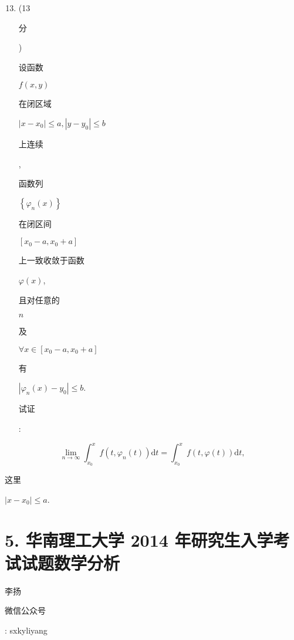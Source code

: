 \documentclass[10pt]{article}
\begin{document}
\begin{enumerate}
  \setcounter{enumi}{12}
  \item (13 \begin{CJK}{UTF8}{mj}分\end{CJK}) \begin{CJK}{UTF8}{mj}设函数\end{CJK} $f(x, y)$ \begin{CJK}{UTF8}{mj}在闭区域\end{CJK} $\left|x-x_{0}\right| \leq a,\left|y-y_{0}\right| \leq b$ \begin{CJK}{UTF8}{mj}上连续\end{CJK}, \begin{CJK}{UTF8}{mj}函数列\end{CJK} $\left\{\varphi_{n}(x)\right\}$ \begin{CJK}{UTF8}{mj}在闭区间\end{CJK} $\left[x_{0}-a, x_{0}+a\right]$ \begin{CJK}{UTF8}{mj}上一致收敛于函数\end{CJK} $\varphi(x)$, \begin{CJK}{UTF8}{mj}且对任意的\end{CJK} $n$ \begin{CJK}{UTF8}{mj}及\end{CJK} $\forall x \in\left[x_{0}-a, x_{0}+a\right]$ \begin{CJK}{UTF8}{mj}有\end{CJK} $\left|\varphi_{n}(x)-y_{0}\right| \leq b$. \begin{CJK}{UTF8}{mj}试证\end{CJK}:
\end{enumerate}
$$
\lim _{n \rightarrow \infty} \int_{x_{0}}^{x} f\left(t, \varphi_{n}(t)\right) \mathrm{d} t=\int_{x_{0}}^{x} f(t, \varphi(t)) \mathrm{d} t,
$$
\begin{CJK}{UTF8}{mj}这里\end{CJK} $\left|x-x_{0}\right| \leq a$.

\section{5. 华南理工大学 2014 年研究生入学考试试题数学分析}
\begin{CJK}{UTF8}{mj}李扬\end{CJK}

\begin{CJK}{UTF8}{mj}微信公众号\end{CJK}: sxkyliyang
\end{document}
